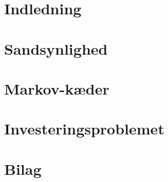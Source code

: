 

 




\chapter{Indledning} 
    

\chapter{Sandsynlighed}\label{kapitel:sandsynlighed}


%

\chapter{Markov-kæder}\label{Kap:MArkov-kæder}


\chapter{Investeringsproblemet}



\chapter{Bilag}
    


\cite{hoel1986introduction}
\cite{kaas2008modern}
\cite{oxford}


